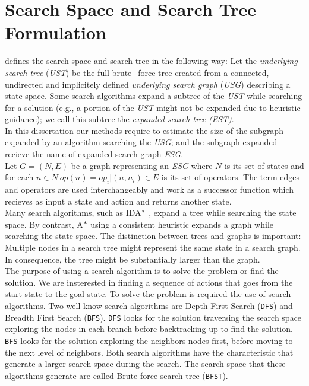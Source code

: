 \section{Search Space and Search Tree Formulation}
\cite{lelis2013predicting} defines the search space and search tree in the following way: Let the \textit{underlying search tree} (\textit{UST}) be the full brute$-$force tree created from a connected, undirected and implicitely defined \textit{underlying search graph} (\textit{USG}) describing a state space. Some search algorithms expand a subtree of the \textit{UST} while searching for a solution (\textsf{e.g.,} a portion of the \textit{UST} might not be expanded due to heuristic guidance); we call this subtree the \textit{expanded search tree} \textit{(EST)}.\\

In this dissertation our methods require to estimate the size of the subgraph expanded by an algorithm searching the \textit{USG}; and the subgraph expanded recieve the name of expanded search graph \textit{ESG}.\\

Let $G = (N,E)$ be a graph representing an \textit{ESG} where $N$ is its set of states and for each $n \in N\  op(n) = {op_{i}|(n, n_i) \in E}$ is its set of operators. The term edges and operators are used interchangeably and work as a successor function which recieves as input a state and action and returns another state.\\

Many search algorithms, such as IDA$\sp{*}$ \cite{Korf85ida}, expand a tree while searching the state space. By contrast, A$\sp{*}$ using a consistent heuristic expands a graph while searching the state space. The distinction between trees and graphs is important: Multiple nodes in a search tree might represent the same state in a search graph. In consequence, the tree might be substantially larger than the graph.\\

The purpose of using a search algorithm is to solve the problem or find the solution. We are insterested in finding a sequence of actions that goes from the start state to the goal state. To solve the problem is required the use of search algorithms. Two well know search algorithms are Depth First Search (\texttt{DFS}) and Breadth First Search (\texttt{BFS}). \texttt{DFS} looks for the solution traversing the search space exploring the nodes in each branch before backtracking up to find the solution. \texttt{BFS} looks for the solution exploring the neighbors nodes first, before moving to the next level of neighbors. Both search algorithms have the characteristic that generate a larger search space during the search. The search space that these algorithms generate are called Brute force search tree (\texttt{BFST}).\\

